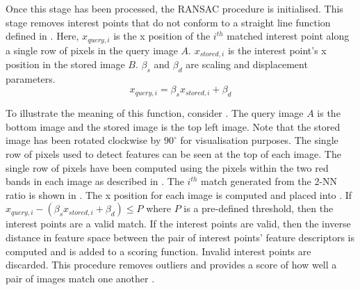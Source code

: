 Once this stage has been processed, the RANSAC procedure is initialised. This stage removes interest points that do not conform to a straight line function defined in  \citep{Anderson}. Here, $x_{query,i}$ is the x position of the $i^{th}$ matched interest point along a single row of pixels in the query image $A$.  $x_{stored,i}$ is the interest point's x position in the stored image $B$. $\beta_s$ and $\beta_d$ are scaling and displacement parameters.\\

\begin{equation}
x_{query,i} = \beta_s x_{stored,i} + \beta_d
\label{eqn:straightLine}
\end{equation} 

To illustrate the meaning of this function, consider . The query image $A$ is the bottom image and the stored image is the top left image. Note that the stored image has been rotated clockwise by $90^{\circ}$ for visualisation purposes. The single row of pixels used to detect features can be seen at the top of each image. The single row of pixels have been computed using the pixels within the two red bands in each image as described in . The $i^{th}$ match generated from the 2-NN ratio is shown in . The x position for each image is computed and placed into . If $x_{query,i} - (\beta_s x_{stored,i} + \beta_d) \leq P$ where $P$ is a pre-defined threshold, then the interest points are a valid match. If the interest points are valid, then the inverse distance in feature space between the pair of interest points' feature descriptors is computed and is added to a scoring function. Invalid interest points are discarded. This procedure removes outliers and provides a score of how well a pair of images match one another \citep{Anderson}.\\


